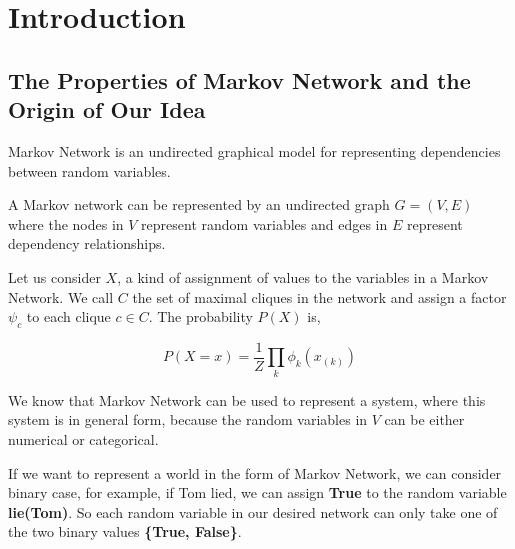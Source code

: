 \documentclass[
12pt, %
a4paper, %
oneside, %
headinclude,footinclude, %
BCOR5mm, %
]{scrartcl}
\begin{document}

\let\thefootnote\relax{}




\newpage %

\section{Introduction}
\subsection{The Properties of Markov Network and the Origin of Our Idea}
Markov Network is an undirected graphical model for representing dependencies between random variables.

A Markov network can be represented by an undirected graph $G = (V,E)$ where the nodes in $V$ represent random variables
and edges in $E$ represent dependency relationships.

Let us consider $X$, a kind of assignment of values to the variables in a Markov Network. We call $C$ the set of maximal
cliques in the network and assign a factor $\psi_c$ to each clique $c \in C$. The probability $P(X)$ is,

\begin{equation}
    P(X=x)=\frac{1}{Z}\prod_k\phi_k(x_{(k)})
\end{equation}

We know that Markov Network can be used to represent a system, where this system is in general form, because the random
variables in $V$ can be either numerical or categorical.

If we want to represent a world in the form of Markov Network, we can consider binary case, for example, if Tom lied, we
can assign \textbf{True} to the random variable \textbf{lie(Tom)}. So each random variable in our desired network can only take one of
the two binary values \textbf{\{True, False\}}.
\end{document}
